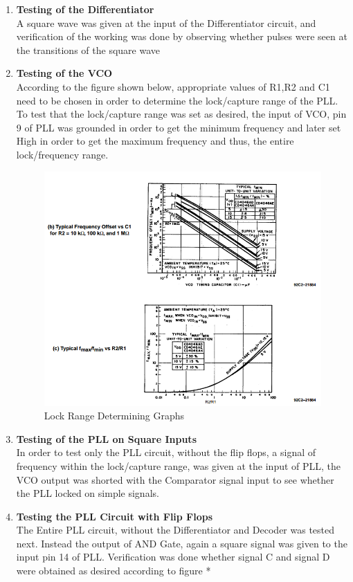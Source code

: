 \documentclass{article}
\begin{document}
\begin{enumerate}[label=(\alph*)]
\item \textbf{Testing of the Differentiator}\\ A square wave was given at the input of the Differentiator circuit, and verification of the working was done by observing whether pulses were seen at the transitions of the square wave 
\item \textbf{Testing of the VCO}\\ According to the figure shown below, appropriate values of R1,R2 and C1 need to be chosen in order to determine the lock/capture range of the PLL. To test that the lock/capture range was set as desired, the input of VCO, pin 9 of PLL was grounded in order to get the minimum frequency and later set High in order to get the maximum frequency and thus, the entire lock/frequency range.
    \begin{figure}[h]
    \includegraphics[scale=0.45]{images/FreqDeterm}
    \caption{Lock Range Determining Graphs}
    \label{fig:PLL}
  \end{figure}
\item \textbf{Testing of the PLL on Square Inputs}\\ In order to test only the PLL circuit, without the flip flops, a signal of frequency within the lock/capture range, was given at the input of PLL, the VCO output was shorted with the Comparator signal input to see whether the PLL locked on simple signals.
\item \textbf{Testing the PLL Circuit with Flip Flops}\\ The Entire PLL circuit, without the Differentiator and Decoder was tested next. Instead the output of AND Gate, again a square signal was given to the input pin 14 of PLL. Verification was done whether signal C and signal D were obtained as desired according to figure *


\end{enumerate}
\end{document}
